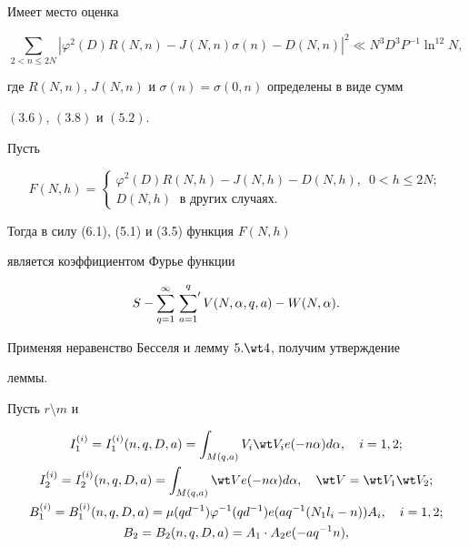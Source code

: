 \begin{lems}


Имеет место оценка


$$


\sum_{2<n\le 2N}|\varphi^2(D)R(N,n)-J(N,n)\sigma(n)-D(N,n)|^2


\ll N^3D^3P^{-1}\ln^{12} N,


$$


где $R(N,n)$, $J(N,n)$ и $\sigma(n)=\sigma(0,n)$ определены в виде сумм 


$(3.6)$, $(3.8)$ и $(5.2)$.


\end{lems}





\begin{pf}


Пусть


$$


F(N,h)=


\begin{cases}


\varphi^2(D)R(N,h)-J(N,h)-D(N,h),\ \; 0<h\le 2N;\\


D(N,h)\; \text{ в других случаях}.


\end{cases}


$$


Тогда в силу (6.1), (5.1) и (3.5) функция $F(N,h)$


является коэффициентом Фурье функции


$$


S - \sum_{q=1}^{\infty}\sideset{}{'}\sum_{a=1}^q 


V(N,\alpha, q, a)-W(N,\alpha).


$$


Применяя неравенство Бесселя и лемму $5.\wt 4$, получим утверждение


леммы.


\end{pf}





Пусть $r\setminus m$ и


\begin{gather}


I_1^{(i)}=I_1^{(i)}(n,q,D,a)=\int_{M(q,a)}V_i\wt V_i


e(-n\alpha)d\alpha,\quad i=1,2;\\


%


I_2^{(i)}=I_2^{(i)}(n,q,D,a)=\int_{M(q,a)}\wt V


e(-n\alpha)d\alpha,\quad \wt V=\wt V_1\wt V_2; \\


%


B_1^{(i)}=B_1^{(i)}(n,q,D,a)=\mu(qd^{-1})\varphi^{-1}(qd^{-1})


e(aq^{-1}(N_1l_i-n))A_i,\quad i=1,2;\\


%


B_2=B_2(n,q,D,a)=A_1\cdot A_2e(-aq^{-1}n),


\end{gather}


